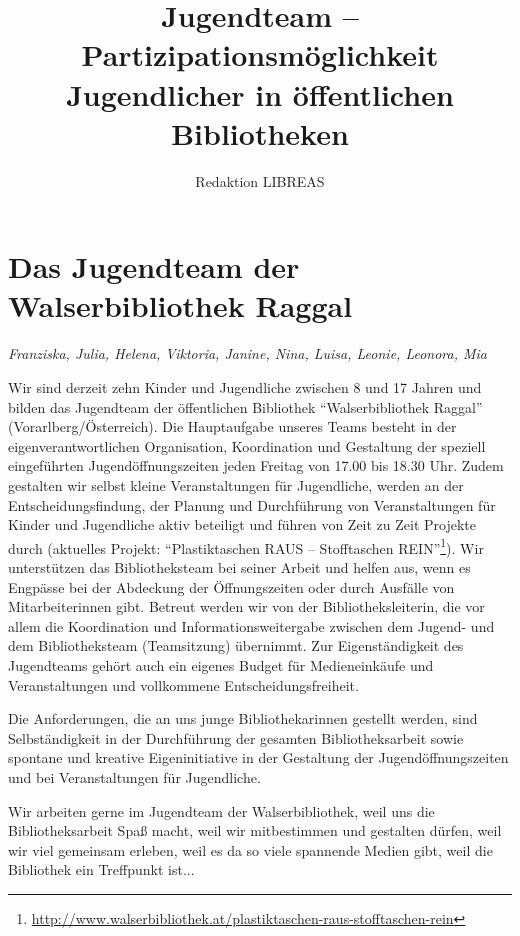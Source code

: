\documentclass[a4paper,
fontsize=11pt,
oneside,
numbers=noperiodatend,
parskip=half-,
bibliography=totoc,
final
]{scrartcl}
\title{\LARGE{Jugendteam -- Partizipationsmöglichkeit Jugendlicher in öffentlichen Bibliotheken}} %
\author{Redaktion LIBREAS} %
\date{}
\begin{document}
\maketitle
\thispagestyle{fancyplain} 


\hypertarget{das-jugendteam-der-walserbibliothek-raggal}{%
\section*{Das Jugendteam der Walserbibliothek
Raggal}\label{das-jugendteam-der-walserbibliothek-raggal}}

\emph{Franziska, Julia, Helena, Viktoria, Janine, Nina, Luisa, Leonie,
Leonora, Mia}

Wir sind derzeit zehn Kinder und Jugendliche zwischen 8 und 17 Jahren
und bilden das Jugendteam der öffentlichen Bibliothek
\enquote{Walserbibliothek Raggal} (Vorarlberg/Österreich). Die
Hauptaufgabe unseres Teams besteht in der eigenverantwortlichen
Organisation, Koordination und Gestaltung der speziell eingeführten
Jugendöffnungszeiten jeden Freitag von 17.00 bis 18.30 Uhr. Zudem
gestalten wir selbst kleine Veranstaltungen für Jugendliche, werden an
der Entscheidungsfindung, der Planung und Durchführung von
Veranstaltungen für Kinder und Jugendliche aktiv beteiligt und führen
von Zeit zu Zeit Projekte durch (aktuelles Projekt:
\enquote{Plastiktaschen RAUS -- Stofftaschen REIN}\footnote{\url{http://www.walserbibliothek.at/plastiktaschen-raus-stofftaschen-rein}}).
Wir unterstützen das Bibliotheksteam bei seiner Arbeit und helfen aus,
wenn es Engpässe bei der Abdeckung der Öffnungszeiten oder durch
Ausfälle von Mitarbeiterinnen gibt. Betreut werden wir von der
Bibliotheksleiterin, die vor allem die Koordination und
Informationsweitergabe zwischen dem Jugend- und dem Bibliotheksteam
(Teamsitzung) übernimmt. Zur Eigenständigkeit des Jugendteams gehört
auch ein eigenes Budget für Medieneinkäufe und Veranstaltungen und
vollkommene Entscheidungsfreiheit.

Die Anforderungen, die an uns junge Bibliothekarinnen gestellt werden,
sind Selbständigkeit in der Durchführung der gesamten Bibliotheksarbeit
sowie spontane und kreative Eigeninitiative in der Gestaltung der
Jugendöffnungszeiten und bei Veranstaltungen für Jugendliche.

Wir arbeiten gerne im Jugendteam der Walserbibliothek, weil uns die
Bibliotheksarbeit Spaß macht, weil wir mitbestimmen und gestalten
dürfen, weil wir viel gemeinsam erleben, weil es da so viele spannende
Medien gibt, weil die Bibliothek ein Treffpunkt ist...
\end{document}
